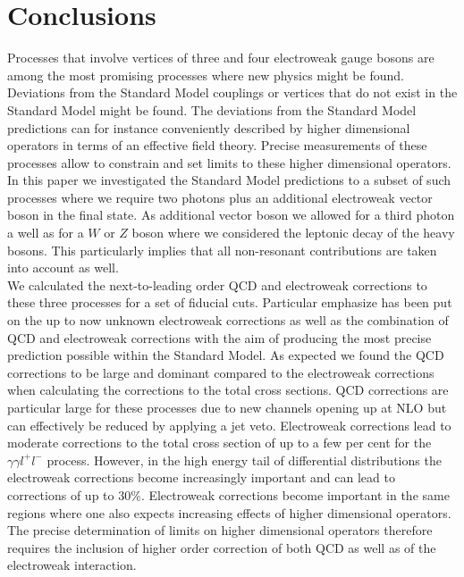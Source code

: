 \section{Conclusions}
\label{sec:conclusions}
Processes that involve vertices of three and four electroweak gauge bosons are among the most promising processes
where new physics might be found. Deviations from the Standard Model couplings or vertices that do not exist in the 
Standard Model might be found. The deviations from the Standard Model predictions can for instance conveniently 
described by higher dimensional operators in terms of an effective field theory. Precise measurements of these  
processes allow to constrain and set limits to these higher dimensional operators.\\
In this paper we investigated the Standard Model predictions to a subset of such processes where we require
two photons plus an additional electroweak vector boson in the final state.  As additional vector boson we allowed
for a third photon a well as for a $W$ or $Z$ boson where we considered the leptonic decay of the heavy bosons.
This particularly implies that all non-resonant contributions are taken into account as well.\\
We calculated the next-to-leading order QCD and electroweak corrections to these three processes for a set
of fiducial cuts. Particular
emphasize has been put on the up to now unknown electroweak corrections as well as the combination of QCD and
electroweak corrections with the aim of producing the most precise prediction possible within the Standard Model.
As expected we found the QCD corrections to be large and dominant compared to the electroweak corrections when 
calculating the corrections to the total cross sections. QCD corrections are particular large for these processes due to new
channels opening up at NLO but can effectively be reduced by applying a jet veto. Electroweak corrections
lead to moderate corrections to the total cross section of up to a few per cent for the $\gamma\gamma l^{+}l^{-}$ 
process. However, in the high energy tail of differential distributions the electroweak corrections become increasingly important
and can lead to corrections of up to $30 \%$. Electroweak corrections become important in the same regions where one
also expects increasing effects of higher dimensional operators. The precise determination of limits on higher dimensional 
operators therefore requires the inclusion of higher order correction of both QCD as well as of the electroweak interaction.



